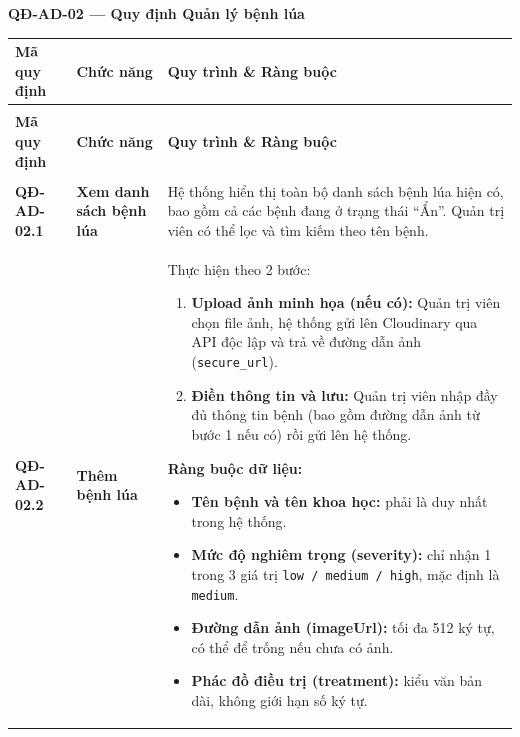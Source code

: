 \documentclass[12pt,a4paper]{article}
\begin{document}
\vspace{0.3cm}
\noindent\textbf{QĐ-AD-02 --- Quy định Quản lý bệnh lúa}

\begin{longtable}{|
        >{\raggedright\arraybackslash}p{2.2cm}|
        >{\raggedright\arraybackslash}p{2.8cm}|
        >{\raggedright\arraybackslash}p{9.8cm}|}
    \hline
    \rowcolor{headerblue}
    \textbf{Mã quy định} & \textbf{Chức năng} & \textbf{Quy trình \& Ràng buộc} \\
    \hline
    \endfirsthead
    \multicolumn{3}{c}{{\tablename\ -- Tiếp theo trang trước}} \\
    \hline
    \rowcolor{headerblue}
    \textbf{Mã quy định} & \textbf{Chức năng} & \textbf{Quy trình \& Ràng buộc} \\
    \hline
    \endhead
    \hline \multicolumn{3}{|r|}{{Tiếp tục ở trang sau...}} \\ \hline
    \endfoot
    \hline
    \endlastfoot
    \textbf{QĐ-AD-02.1} & \textbf{Xem danh sách bệnh lúa} &
    Hệ thống hiển thị toàn bộ danh sách bệnh lúa hiện có, bao gồm cả các bệnh đang ở trạng thái ``Ẩn''. Quản trị viên có thể lọc và tìm kiếm theo tên bệnh. \\
    \hline
    \textbf{QĐ-AD-02.2} & \textbf{Thêm bệnh lúa} &
    Thực hiện theo 2 bước:
    \begin{enumerate}[leftmargin=*,topsep=2pt,itemsep=1pt]
        \item \textbf{Upload ảnh minh họa (nếu có):} Quản trị viên chọn file ảnh, hệ thống gửi lên Cloudinary qua API độc lập và trả về đường dẫn ảnh (\texttt{secure\_url}).
        \item \textbf{Điền thông tin và lưu:} Quản trị viên nhập đầy đủ thông tin bệnh (bao gồm đường dẫn ảnh từ bước 1 nếu có) rồi gửi lên hệ thống.
    \end{enumerate}
    \textbf{Ràng buộc dữ liệu:}
    \begin{itemize}[leftmargin=*,topsep=2pt,itemsep=1pt]
        \item \textbf{Tên bệnh và tên khoa học:} phải là duy nhất trong hệ thống.
        \item \textbf{Mức độ nghiêm trọng (severity):} chỉ nhận 1 trong 3 giá trị \texttt{low / medium / high}, mặc định là \texttt{medium}.
        \item \textbf{Đường dẫn ảnh (imageUrl):} tối đa 512 ký tự, có thể để trống nếu chưa có ảnh.
        \item \textbf{Phác đồ điều trị (treatment):} kiểu văn bản dài, không giới hạn số ký tự.

\end{itemize}
\end{longtable}
\end{document}
